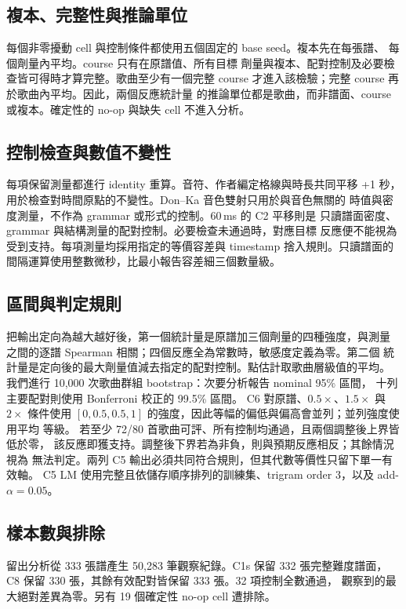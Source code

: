 \documentclass[10pt,twocolumn]{article}
\begin{document}
\subsection{複本、完整性與推論單位}

每個非零擾動 cell 與控制條件都使用五個固定的 base seed。複本先在每張譜、
每個劑量內平均。course 只有在原譜值、所有目標
劑量與複本、配對控制及必要檢查皆可得時才算完整。歌曲至少有一個完整
course 才進入該檢驗；完整 course 再於歌曲內平均。因此，兩個反應統計量
的推論單位都是歌曲，而非譜面、course 或複本。確定性的 no-op 與缺失 cell
不進入分析。

\subsection{控制檢查與數值不變性}

每項保留測量都進行 identity 重算。音符、作者編定格線與時長共同平移
+1 秒，用於檢查對時間原點的不變性。Don--Ka 音色雙射只用於與音色無關的
時值與密度測量，不作為 grammar 或形式的控制。60\,ms 的 C2 平移則是
只讀譜面密度、grammar 與結構測量的配對控制。必要檢查未通過時，對應目標
反應便不能視為受到支持。每項測量均採用指定的等價容差與 timestamp
捨入規則。只讀譜面的間隔運算使用整數微秒，比最小報告容差細三個數量級。

\subsection{區間與判定規則}

把輸出定向為越大越好後，第一個統計量是原譜加三個劑量的四種強度，與測量
之間的逐譜 Spearman 相關；四個反應全為常數時，敏感度定義為零。第二個
統計量是定向後的最大劑量值減去指定的配對控制。點估計取歌曲層級值的平均。
我們進行 10{,}000 次歌曲群組 bootstrap：次要分析報告 nominal 95\% 區間，
十列主要配對則使用 Bonferroni 校正的 99.5\% 區間。
C6 對原譜、$0.5\times$、$1.5\times$ 與 $2\times$ 條件使用
$[0,0.5,0.5,1]$ 的強度，因此等幅的偏低與偏高會並列；並列強度使用平均
等級。
若至少 72/80 首歌曲可評、所有控制均通過，且兩個調整後上界皆低於零，
該反應即獲支持。調整後下界若為非負，則與預期反應相反；其餘情況視為
無法判定。兩列 C5 輸出必須共同符合規則，但其代數等價性只留下單一有效軸。
C5 LM 使用完整且依儲存順序排列的訓練集、trigram order 3，以及
add-$\alpha=0.05$。

\subsection{樣本數與排除}

留出分析從 333 張譜產生 50{,}283 筆觀察紀錄。C1s 保留 332 張完整難度譜面，
C8 保留 330 張，其餘有效配對皆保留 333 張。32 項控制全數通過，
觀察到的最大絕對差異為零。另有 19 個確定性 no-op cell 遭排除。
\end{document}
